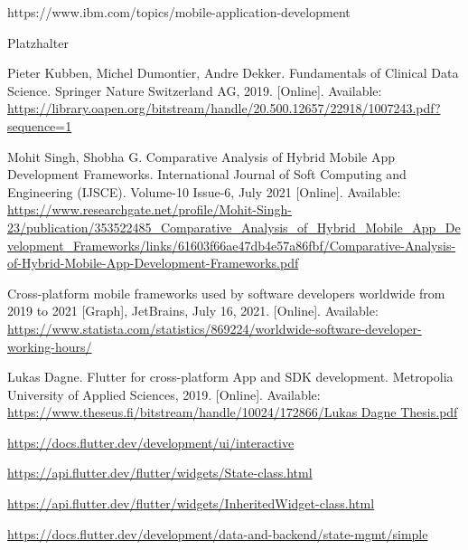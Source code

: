  https://www.ibm.com/topics/mobile-application-development

 Platzhalter

 Pieter Kubben, Michel Dumontier, Andre Dekker. Fundamentals of Clinical Data Science. Springer Nature Switzerland AG, 2019. [Online]. Available: \url{https://library.oapen.org/bitstream/handle/20.500.12657/22918/1007243.pdf?sequence=1}

 Mohit Singh, Shobha G. Comparative Analysis of Hybrid Mobile App Development Frameworks. International Journal of Soft Computing and Engineering (IJSCE). Volume-10 Issue-6, July 2021 [Online]. Available: \url{https://www.researchgate.net/profile/Mohit-Singh-23/publication/353522485_Comparative_Analysis_of_Hybrid_Mobile_App_Development_Frameworks/links/61603f66ae47db4e57a86fbf/Comparative-Analysis-of-Hybrid-Mobile-App-Development-Frameworks.pdf}

 Cross-platform mobile frameworks used by software developers worldwide from 2019 to 2021 [Graph], JetBrains, July 16, 2021. [Online]. Available: \url{https://www.statista.com/statistics/869224/worldwide-software-developer-working-hours/}

 Lukas Dagne. Flutter for cross-platform App and SDK development. Metropolia University of Applied Sciences, 2019. [Online]. Available: \url{https://www.theseus.fi/bitstream/handle/10024/172866/Lukas Dagne Thesis.pdf}

 \url{https://docs.flutter.dev/development/ui/interactive}

 \url{https://api.flutter.dev/flutter/widgets/State-class.html}

 \url{https://api.flutter.dev/flutter/widgets/InheritedWidget-class.html}

 \url{https://docs.flutter.dev/development/data-and-backend/state-mgmt/simple}